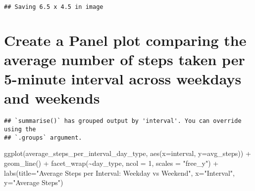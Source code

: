 \documentclass[
]{article}
\newenvironment{Shaded}{\begin{snugshade}}{\end{snugshade}}
\newcommand{\AttributeTok}[1]{\textcolor[rgb]{0.77,0.63,0.00}{#1}}
\newcommand{\DecValTok}[1]{\textcolor[rgb]{0.00,0.00,0.81}{#1}}
\newcommand{\FunctionTok}[1]{\textcolor[rgb]{0.00,0.00,0.00}{#1}}
\newcommand{\NormalTok}[1]{#1}
\newcommand{\OtherTok}[1]{\textcolor[rgb]{0.56,0.35,0.01}{#1}}
\newcommand{\SpecialCharTok}[1]{\textcolor[rgb]{0.00,0.00,0.00}{#1}}
\newcommand{\StringTok}[1]{\textcolor[rgb]{0.31,0.60,0.02}{#1}}
\begin{document}
\begin{verbatim}
## Saving 6.5 x 4.5 in image
\end{verbatim}

\hypertarget{create-a-panel-plot-comparing-the-average-number-of-steps-taken-per-5-minute-interval-across-weekdays-and-weekends}{%
\section{Create a Panel plot comparing the average number of steps taken
per 5-minute interval across weekdays and
weekends}\label{create-a-panel-plot-comparing-the-average-number-of-steps-taken-per-5-minute-interval-across-weekdays-and-weekends}}

\begin{Shaded}
\end{Shaded}

\begin{verbatim}
## `summarise()` has grouped output by 'interval'. You can override using the
## `.groups` argument.
\end{verbatim}

\begin{Shaded}
\begin{Highlighting}[]
\FunctionTok{ggplot}\NormalTok{(average\_steps\_per\_interval\_day\_type, }\FunctionTok{aes}\NormalTok{(}\AttributeTok{x=}\NormalTok{interval, }\AttributeTok{y=}\NormalTok{avg\_steps)) }\SpecialCharTok{+}
  \FunctionTok{geom\_line}\NormalTok{() }\SpecialCharTok{+}
  \FunctionTok{facet\_wrap}\NormalTok{(}\SpecialCharTok{\textasciitilde{}}\NormalTok{day\_type, }\AttributeTok{ncol =} \DecValTok{1}\NormalTok{, }\AttributeTok{scales =} \StringTok{"free\_y"}\NormalTok{) }\SpecialCharTok{+}
  \FunctionTok{labs}\NormalTok{(}\AttributeTok{title=}\StringTok{"Average Steps per Interval: Weekday vs Weekend"}\NormalTok{, }\AttributeTok{x=}\StringTok{"Interval"}\NormalTok{, }\AttributeTok{y=}\StringTok{"Average Steps"}\NormalTok{)}
\end{Highlighting}
\end{Shaded}
\end{document}
